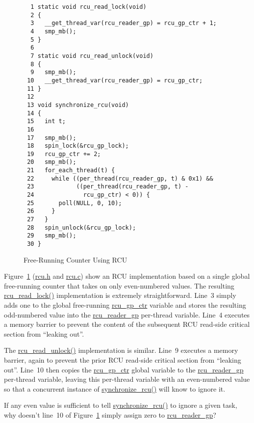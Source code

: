 \begin{figure}[tbp]
{ \scriptsize
\begin{verbatim}
  1 static void rcu_read_lock(void)
  2 {
  3   __get_thread_var(rcu_reader_gp) = rcu_gp_ctr + 1;
  4   smp_mb();
  5 }
  6
  7 static void rcu_read_unlock(void)
  8 {
  9   smp_mb();
 10   __get_thread_var(rcu_reader_gp) = rcu_gp_ctr;
 11 }
 12
 13 void synchronize_rcu(void)
 14 {
 15   int t;
 16
 17   smp_mb();
 18   spin_lock(&rcu_gp_lock);
 19   rcu_gp_ctr += 2;
 20   smp_mb();
 21   for_each_thread(t) {
 22     while ((per_thread(rcu_reader_gp, t) & 0x1) &&
 23            ((per_thread(rcu_reader_gp, t) -
 24              rcu_gp_ctr) < 0)) {
 25       poll(NULL, 0, 10);
 26     }
 27   }
 28   spin_unlock(&rcu_gp_lock);
 29   smp_mb();
 30 }
\end{verbatim}
}
\caption{Free-Running Counter Using RCU}
\label{fig:defer:Free-Running Counter Using RCU}
\end{figure}

Figure~\ref{fig:defer:Free-Running Counter Using RCU}
(\url{rcu.h} and \url{rcu.c})
show an RCU implementation based on a single global free-running counter
that takes on only even-numbered values.
The resulting \url{rcu_read_lock()} implementation is extremely
straightforward.
Line~3 simply adds one to the global free-running \url{rcu_gp_ctr}
variable and stores the resulting odd-numbered value into the
\url{rcu_reader_gp} per-thread variable.
Line~4 executes a memory barrier to prevent the content of the
subsequent RCU read-side critical section from ``leaking out''.

The \url{rcu_read_unlock()} implementation is similar.
Line~9 executes a memory barrier, again to prevent the prior RCU
read-side critical section from ``leaking out''.
Line~10 then copies the \url{rcu_gp_ctr} global variable to the
\url{rcu_reader_gp} per-thread variable, leaving this per-thread
variable with an even-numbered value so that a concurrent instance
of \url{synchronize_rcu()} will know to ignore it.

\QuickQuiz{}
	If any even value is sufficient to tell \url{synchronize_rcu()}
	to ignore a given task, why doesn't line~10 of
	Figure~\ref{fig:defer:Free-Running Counter Using RCU}
	simply assign zero to \url{rcu_reader_gp}?
 \QuickQuizEnd

